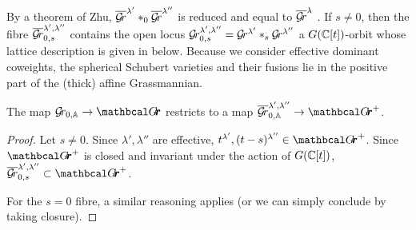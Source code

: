 \documentclass[draft]{article} %
\begin{document}
By a theorem of Zhu, $ \overline{\mathcal{G}\!r}^{\lambda'} \ast_{0} \overline{\mathcal{G}\!r}^{\lambda''} $ is reduced and equal to $ \overline{\mathcal{G}\!r}^{\lambda}$ \cite[Proposition 3.1.14]{zhu2016introduction}.
If $s\ne0$, then the fibre $\overline{\mathcal{G}\!r}_{0,s}^{\lambda', \lambda''}$ contains the open locus $ \mathcal{G}\!r_{0,s}^{\lambda', \lambda''} =  \mathcal{G}\!r^{\lambda'} \ast_{s} \mathcal{G}\!r^{\lambda''} $ a $ G(\mathbb C[t])$-orbit
whose lattice description is given in  below.
% 
Because we consider effective dominant coweights, the spherical Schubert varieties and their fusions lie in the positive part of the (thick) affine Grassmannian.
% 
\begin{lemma}
\label{le:sphfusispos}
    The map $ \Gr_{0, \AA} \rightarrow \Grth$ restricts to a map $ \overline{\Gr}^{\lambda', \lambda''}_{0, \AA} \rightarrow \Grth^+$.
\end{lemma}
\begin{proof}
    Let $ s \ne 0 $. Since $ \lambda', \lambda'' $ are effective, $ t^{\lambda'}, (t-s)^{\lambda''} \in \Grth^+ $.  Since $\Grth^+$ is closed and invariant under the action of $ G(\mathbb C[t])$,  $ \overline{\Gr}_{0,s}^{\lambda', \lambda''} \subset \Grth^+$.
    
    For the $ s = 0$ fibre, a similar reasoning applies (or we can simply conclude by taking closure).
\end{proof}



\end{document}
